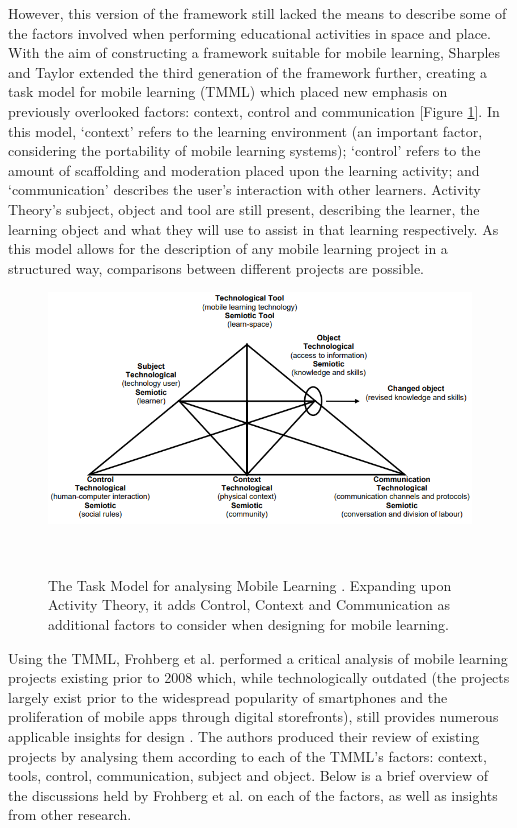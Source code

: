 However, this version of the framework still lacked the means to describe some of the factors involved when performing educational activities in space and place. With the aim of constructing a framework suitable for mobile learning, Sharples and Taylor extended the third generation of the framework further, creating a task model for mobile learning (TMML) which placed new emphasis on previously overlooked factors: context, control and communication \citep{Sharples2007,Taylor2006} [Figure \ref{fig:taskModelMLearning}]. In this model, `context' refers to the learning environment (an important factor, considering the portability of mobile learning systems); `control' refers to the amount of scaffolding and moderation placed upon the learning activity; and `communication' describes the user’s interaction with other learners. Activity Theory’s subject, object and tool are still present, describing the learner, the learning object and what they will use to assist in that learning respectively. As this model allows for the description of any mobile learning project in a structured way, comparisons between different projects are possible.

\begin{figure}
\centering
  \includegraphics[width=1\columnwidth]{images/chapter03/taskModelForMobileLearning.PNG}
  \caption[The Task Model for Mobile Learning]{ The Task Model for analysing Mobile Learning \citep{Taylor2006}. Expanding upon Activity Theory, it adds Control, Context and Communication as additional factors to consider when designing for mobile learning.}~\label{fig:taskModelMLearning}
\end{figure}

Using the TMML, Frohberg et al. performed a critical analysis of mobile learning projects existing prior to 2008 which, while technologically outdated (the projects largely exist prior to the widespread popularity of smartphones and the proliferation of mobile apps through digital storefronts), still provides numerous applicable insights for design \citep{Frohberg2009}. The authors produced their review of existing projects by analysing them according to each of the TMML's factors: context, tools, control, communication, subject and object. Below is a brief overview of the discussions held by Frohberg et al. on each of the factors, as well as insights from other research.

